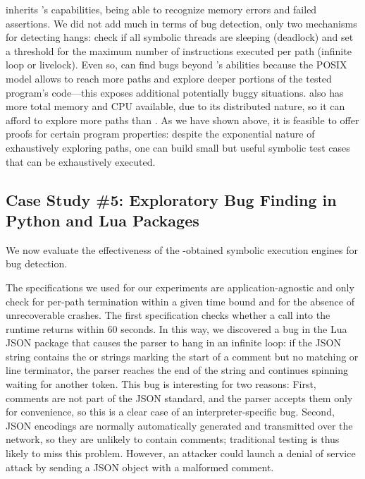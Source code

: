 \cnine inherits \klee's capabilities, being able to recognize memory errors and failed assertions. We did not add much in terms of bug detection, only two mechanisms for detecting hangs: check if all symbolic threads are sleeping (deadlock) and set a threshold for the maximum number of instructions executed per path (infinite loop or livelock).  Even so, \cnine can find bugs beyond \klee's abilities because the POSIX model allows \cnine to reach more paths and explore deeper portions of the tested program's code---this exposes additional potentially buggy situations. \cnine also has more total memory and CPU available, due to its distributed nature, so it can afford to explore more paths than \klee.  As we have shown above, it is feasible to offer proofs for certain program properties: despite the exponential nature of exhaustively exploring paths, one can build small but useful symbolic test cases that can be exhaustively executed.


\subsection{Case Study \#5: Exploratory Bug Finding in Python and Lua Packages}
\label{sec:eval:bug-explore}

We now evaluate the effectiveness of the \chef-obtained symbolic execution engines for bug detection.

The specifications we used for our experiments are application-agnostic and only check for per-path termination within a given time bound and for the absence of unrecoverable crashes.  The first specification checks whether a call into the runtime returns within 60 seconds.  In this way, we discovered a bug in the Lua JSON package that causes the parser to hang in an infinite loop: if the JSON string contains the \codebit{/*} or \codebit{//} strings marking the start of a comment but no matching \codebit{*/} or line terminator, the parser reaches the end of the string and continues spinning waiting for another token.
%
This bug is interesting for two reasons: First, comments are not part of the JSON standard, and the parser accepts them only for convenience, so this is a clear case of an interpreter-specific bug.  Second, JSON encodings are normally automatically generated and transmitted over the network, so they are unlikely to contain comments; traditional testing is thus likely to miss this problem. However, an attacker could launch a denial of service attack by sending a JSON object with a malformed comment.

